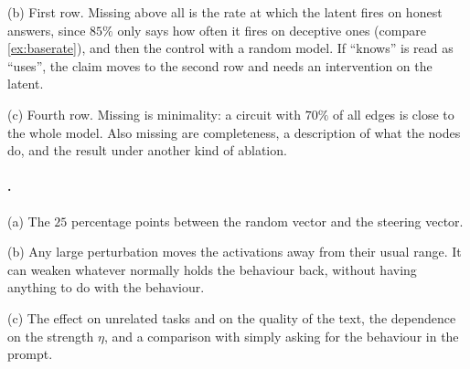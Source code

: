 {(b) First row. Missing above all is the rate at which the latent fires on honest answers, since $85\%$ only says
how often it fires on deceptive ones (compare \cref{ex:baserate}), and then the control with a random model. If
``knows'' is read as ``uses'', the claim moves to the second row and needs an intervention on the latent.

(c) Fourth row. Missing is minimality: a circuit with $70\%$ of all edges is close to the whole model. Also
missing are completeness, a description of what the nodes do, and the result under another kind of ablation.

\paragraph{.}
(a) The $25$ percentage points between the random vector and the steering vector.

(b) Any large perturbation moves the activations away from their usual range. It can weaken whatever normally
holds the behaviour back, without having anything to do with the behaviour.

(c) The effect on unrelated tasks and on the quality of the text, the dependence on the strength $\eta$, and a
comparison with simply asking for the behaviour in the prompt.
}
